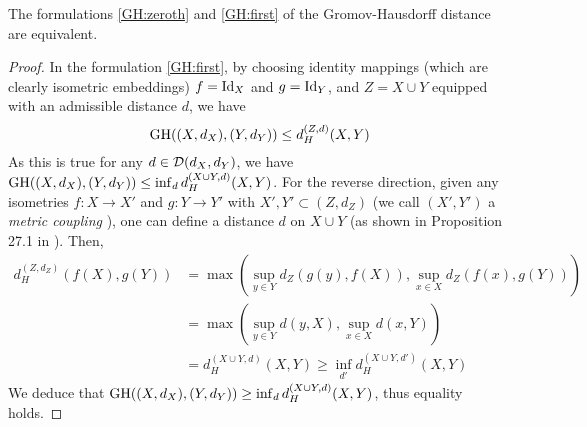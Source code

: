 \begin{corollary}
    The formulations \eqref{GH:zeroth} and \eqref{GH:first} of the Gromov-Hausdorff distance
    are equivalent.
\end{corollary}
\begin{proof}
In the formulation \eqref{GH:first}, by choosing identity mappings (which are clearly isometric embeddings)
$f = \text{Id}_X$ and $g = \text{Id}_Y$, and $Z = X \cup Y$ equipped with an admissible distance $d$, we have
\begin{equation*}
  \text{GH}((X,d_X), (Y,d_Y)) \leq d_{H}^{(Z,d)}(X, Y)
\end{equation*}
As this is true for any $d \in \mathcal D(d_X,d_Y)$, we have
$\text{GH}((X,d_X), (Y,d_Y)) \leq \inf_{d} d_{H}^{(X \cup Y, d)}(X, Y)$. For the reverse direction,
given any isometries $f: X \to X'$ and $g: Y \to Y'$ with $X', Y' \subset (Z, d_Z)$
(we call $(X',Y')$ a \textit{metric coupling} \citep{Villani08}), one can define
a distance $d$ on $X \cup Y$ (as shown in Proposition 27.1 in \citep{Villani08}). Then,
\begin{equation*}
  \begin{split}
    d_H^{(Z, d_Z)}(f(X), g(Y)) &=
  \max(\sup_{y \in Y} d_Z(g(y), f(X)), \sup_{x \in X} d_Z(f(x), g(Y))) \\
  &= \max(\sup_{y \in Y} d(y, X), \sup_{x \in X} d(x, Y)) \\
  &= d_H^{(X \cup Y, d)}(X, Y) \geq \inf_{d'} d_{H}^{(X \cup Y, d')}(X, Y)
  \end{split}
\end{equation*}
We deduce that $\text{GH}((X,d_X), (Y,d_Y)) \geq \inf_{d} d_{H}^{(X \cup Y, d)}(X, Y)$,
thus equality holds.
\end{proof}

